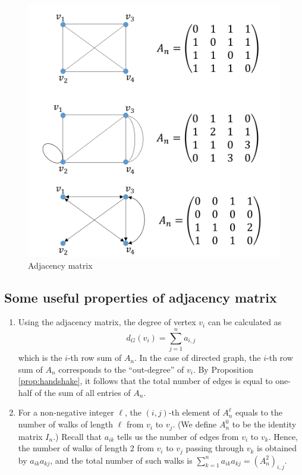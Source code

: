 \documentclass[10.5pt, A4paper, openany, uplatex]{book}
\numberwithin{equation}{section}
\begin{document}
\begin{appendices}
	\begin{figure}[h!]
		\begin{center}
			\includegraphics[width = 12cm]{adjmat.png}
			\caption{Adjacency matrix\label{fig:adjmat}}
		\end{center}
	\end{figure}
	
	\subsection*{Some useful properties of adjacency matrix}
	
	\begin{enumerate}
		\item Using the adjacency matrix, the degree of vertex $v_i$ can be calculated as
		\[
			d_G(v_i) = \sum_{j = 1}^n a_{i,j}
		\]
		which is the $i$-th row sum of $A_n$.
		In the case of directed graph, the $i$-th row sum of $A_n$ corresponds to the ``out-degree'' of $v_i$.
		By Proposition \ref{prop:handshake}, it follows that the total number of edges is equal to one-half of the sum of all entries of $A_n$.
		\item For a non-negative integer $\ell$, the $(i,j)$-th element of $A_n^\ell$ equals to the number of walks of length $\ell$ from $v_i$ to $v_j$. (We define $A_n^0$ to be the identity matrix $I_n$.)
		Recall that $a_{ik}$ tells us the number of edges from $v_i$ to $v_k$.
		Hence, the number of walks of length 2 from $v_i$ to $v_j$ passing through $v_k$ is obtained by $a_{ik}a_{kj}$, and the total number of such walks is $\sum_{k = 1}^n a_{ik}a_{kj} = (A_n^2)_{i,j}$.
	

\end{enumerate}
\end{appendices}
\end{document}
